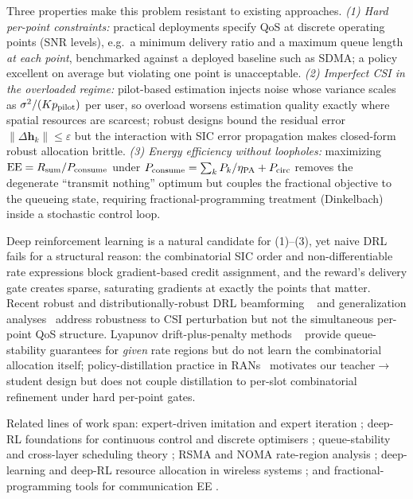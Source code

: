 \documentclass[journal]{IEEEtran}
\newcommand{\vect}[1]{\mathbf{#1}}
\begin{document}
Three properties make this problem resistant to existing approaches.
\emph{(1) Hard per-point constraints:} practical deployments specify QoS at
discrete operating points (SNR levels), e.g.\ a minimum delivery ratio and a
maximum queue length \emph{at each point}, benchmarked against a deployed baseline
such as SDMA; a policy excellent on average but violating one point is
unacceptable. \emph{(2) Imperfect CSI in the overloaded regime:} pilot-based
estimation injects noise whose variance scales as $\sigma^2/(K p_{\rm pilot})$ per
user, so overload worsens estimation quality exactly where spatial resources are
scarcest; robust designs bound the residual error
$\|\Delta \vect{h}_k\| \le \varepsilon$ but the interaction with SIC error
propagation makes closed-form robust allocation brittle. \emph{(3) Energy
efficiency without loopholes:} maximizing $\mathrm{EE}=R_{\rm sum}/P_{\rm consume}$
under $P_{\rm consume}=\sum_k P_k/\eta_{\rm PA}+P_{\rm circ}$ removes the
degenerate ``transmit nothing'' optimum but couples the fractional objective to
the queueing state, requiring fractional-programming treatment (Dinkelbach) inside
a stochastic control loop.

Deep reinforcement learning is a natural candidate for (1)--(3), yet naive DRL
fails for a structural reason: the combinatorial SIC order and non-differentiable
rate expressions block gradient-based credit assignment, and the reward's delivery
gate creates sparse, saturating gradients at exactly the points that matter.
Recent robust and distributionally-robust DRL beamforming
~\cite{schroder2025modelfree,wang2024distributionally,cui2025drsac} and
generalization analyses~\cite{demirel2025generalization,luan2025robust}
address robustness to CSI perturbation but not the simultaneous per-point QoS
structure. Lyapunov drift-plus-penalty methods
~\cite{zhu2025lyapguid,neely2010stochastic,zakeri2024lyaplearn} provide queue-stability
guarantees for \emph{given} rate regions but do not learn the combinatorial
allocation itself; policy-distillation practice in RANs~\cite{khosravi2025practical}
motivates our teacher$\to$student design but does not couple distillation to
per-slot combinatorial refinement under hard per-point gates.

Related lines of work span: expert-driven imitation and expert iteration
\cite{pomerleau1989alvinn,ross2011dagger,rusu2016policydistill,anthony2017exit,silver2016alphago};
deep-RL foundations for continuous control and discrete optimisers
\cite{williams1992reinforce,mnih2015dqn,schulman2015trpo,haarnoja2018sac,hasselt2016doubleq,sutton2018book};
queue-stability and cross-layer scheduling theory
\cite{tassiulas1992stability,georgiadis2006tutorial};
RSMA and NOMA rate-region analysis
\cite{mao2018rsma,clerckx2016rate,clerckx2021openoma};
deep-learning and deep-RL resource allocation in wireless systems
\cite{liang2019v2v,luong2019drlcomm,zhang2019mlwireless};
and fractional-programming tools for communication EE
\cite{dinkelbach1967,shen2018fractional}.
\end{document}
